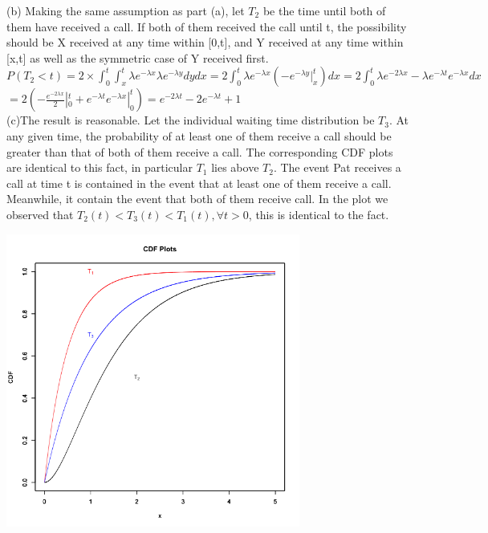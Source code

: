 \documentclass[11pt]{article}
\begin{document}
(b) Making the same assumption as part (a),  let $T_2$ be the time until both of them have received a call. If both of them received the call until t, the possibility should be X received at any time within [0,t], and Y received at any time within [x,t] as well as the symmetric case of Y received first.\\
$P(T_2<t) = 2 \times \int_{0}^{t} \int_{x}^{t}\lambda e^{-\lambda x} \lambda e^{-\lambda y}dydx = 2\int_{0}^{t} \lambda e^{-\lambda x} (-e^{-\lambda y}|_x^t)dx = 2\int_{0}^{t} \lambda e^{-2\lambda x} - \lambda e^{-\lambda t } e^{-\lambda x}dx$\\
$ = 2(-\frac{e^{-2\lambda x}}{2}|_0^t + e^{-\lambda t} e^{-\lambda x}|_0^t) = e^{-2\lambda t} - 2e^{-\lambda t} +1$\\

(c)The result is reasonable. Let the individual waiting time distribution be $T_3$. At any given time, the probability of at least one of  them receive a call should be greater than that of both of them receive a call. The corresponding CDF plots are identical to this fact, in particular $T_1$ lies above $T_2$. The event Pat receives a call at time t is contained in the event that at least one of them receive a call. Meanwhile, it contain the event that both of them receive call. In the plot we observed that $T_2(t)<T_3(t) < T_1(t),\forall t >0$, this is identical to the fact. \\
\begin{center}
	\includegraphics[height = 3.8in]{Q2_3}
  \end{center}

\newpage
\end{document}
